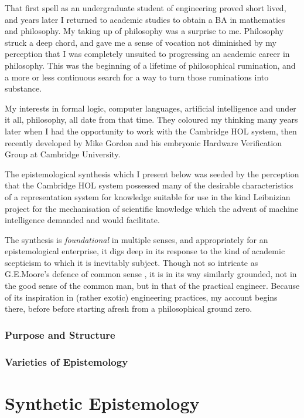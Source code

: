 \documentclass[10pt,titlepage]{book}
\begin{document}
That first spell as an undergraduate student of engineering proved short lived, and years later I returned to academic studies to obtain a BA in mathematics and philosophy.
My taking up of philosophy was a surprise to me.
Philosophy struck a deep chord, and gave me a sense of vocation not diminished by my perception that I was completely unsuited to progressing an academic career in philosophy.
This was the beginning of a lifetime of philosophical rumination, and a more or less continuous search for a way to turn those ruminations into substance.

My interests in formal logic, computer languages, artificial intelligence and under it all, philosophy, all date from that time.
They coloured my thinking many years later when I had the opportunity to work with the Cambridge HOL system, then recently developed by Mike Gordon and his embryonic Hardware Verification Group at Cambridge University.

The epistemological synthesis which I present below was seeded by the perception that the Cambridge HOL system possessed many of the desirable characteristics of a representation system for knowledge suitable for use in the kind Leibnizian project for the mechanisation of scientific knowledge which the advent of machine intelligence demanded and would facilitate.

The synthesis is \emph{foundational} in multiple senses, and appropriately for an epistemological enterprise, it digs deep in its response to the kind of academic scepticism to which it is inevitably subject.
Though not so intricate as G.E.Moore's defence of common sense \cite{moore1925,moore1993}, it is in its way similarly grounded, not in the good sense of the common man, but in that of the practical engineer.
Because of its inspiration in (rather exotic) engineering practices, my account begins there, before before starting afresh from a philosophical ground zero.
\section{Purpose and Structure}

\section{Varieties of Epistemology}

\part{Synthetic Epistemology}
\end{document}
